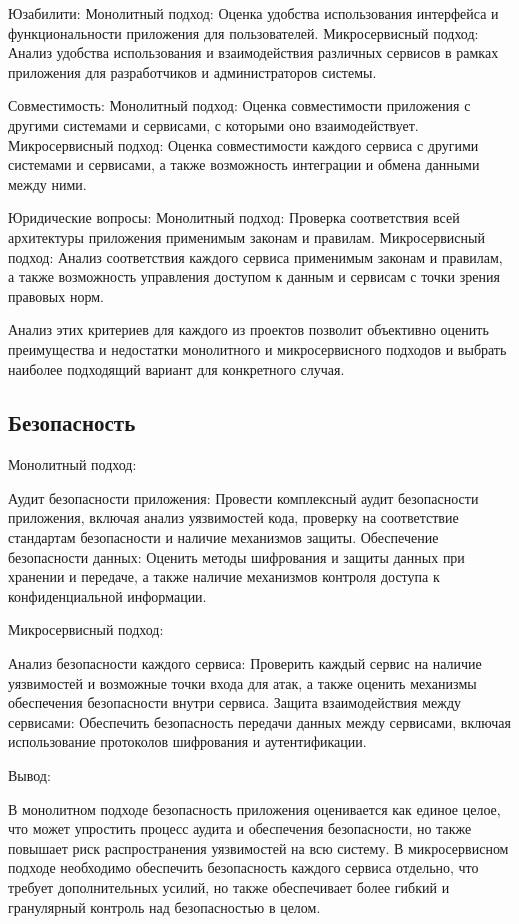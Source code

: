     Юзабилити:
        Монолитный подход: Оценка удобства использования интерфейса и функциональности приложения для пользователей.
        Микросервисный подход: Анализ удобства использования и взаимодействия различных сервисов в рамках приложения для разработчиков и администраторов системы.

    Совместимость:
        Монолитный подход: Оценка совместимости приложения с другими системами и сервисами, с которыми оно взаимодействует.
        Микросервисный подход: Оценка совместимости каждого сервиса с другими системами и сервисами, а также возможность интеграции и обмена данными между ними.

    Юридические вопросы:
        Монолитный подход: Проверка соответствия всей архитектуры приложения применимым законам и правилам.
        Микросервисный подход: Анализ соответствия каждого сервиса применимым законам и правилам, а также возможность управления доступом к данным и сервисам с точки зрения правовых норм.

Анализ этих критериев для каждого из проектов позволит объективно оценить преимущества и недостатки монолитного и микросервисного подходов и выбрать наиболее подходящий вариант для конкретного случая.

\subsection{Безопасность}

Монолитный подход:

    Аудит безопасности приложения: Провести комплексный аудит безопасности приложения, включая анализ уязвимостей кода, проверку на соответствие стандартам безопасности и наличие механизмов защиты.
    Обеспечение безопасности данных: Оценить методы шифрования и защиты данных при хранении и передаче, а также наличие механизмов контроля доступа к конфиденциальной информации.

Микросервисный подход:

    Анализ безопасности каждого сервиса: Проверить каждый сервис на наличие уязвимостей и возможные точки входа для атак, а также оценить механизмы обеспечения безопасности внутри сервиса.
    Защита взаимодействия между сервисами: Обеспечить безопасность передачи данных между сервисами, включая использование протоколов шифрования и аутентификации.

Вывод:

    В монолитном подходе безопасность приложения оценивается как единое целое, что может упростить процесс аудита и обеспечения безопасности, но также повышает риск распространения уязвимостей на всю систему.
    В микросервисном подходе необходимо обеспечить безопасность каждого сервиса отдельно, что требует дополнительных усилий, но также обеспечивает более гибкий и гранулярный контроль над безопасностью в целом.

